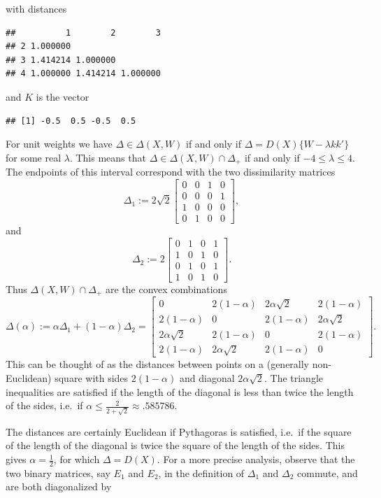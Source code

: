 \documentclass[
  12pt,
]{book}
\theoremstyle{definition}
\theoremstyle{definition}
\theoremstyle{definition}
\theoremstyle{definition}
\theoremstyle{remark}
\begin{document}
with distances

\begin{verbatim}
##          1        2        3
## 2 1.000000                  
## 3 1.414214 1.000000         
## 4 1.000000 1.414214 1.000000
\end{verbatim}

and \(K\) is the vector

\begin{verbatim}
## [1] -0.5  0.5 -0.5  0.5
\end{verbatim}

For unit weights we have \(\Delta\in\Delta(X,W)\) if and only if
\(\Delta=D(X)\{W-\lambda kk'\}\)
for some real \(\lambda\). This means that \(\Delta\in\Delta(X,W)\cap\Delta_+\) if and only if \(-4\leq\lambda\leq 4\). The endpoints of this interval correspond with the two dissimilarity matrices
\[
\Delta_1:=2\sqrt{2}\begin{bmatrix}0&0&1&0\\0&0&0&1\\1&0&0&0\\0&1&0&0\end{bmatrix},
\]
and
\[
\Delta_2:=2\begin{bmatrix}0&1&0&1\\1&0&1&0\\0&1&0&1\\1&0&1&0\end{bmatrix}.
\]
Thus \(\Delta(X,W)\cap\Delta_+\) are the convex combinations
\[
\Delta(\alpha):=\alpha\Delta_1+(1-\alpha)\Delta_2=
\begin{bmatrix}0&2(1-\alpha)&2\alpha\sqrt{2}&2(1-\alpha)\\2(1-\alpha)&0&2(1-\alpha)&2\alpha\sqrt{2}\\2\alpha\sqrt{2}&2(1-\alpha)&0&2(1-\alpha)\\2(1-\alpha)&2\alpha\sqrt{2}&2(1-\alpha)&0\end{bmatrix}.
\]
This can be thought of as the distances between points on a (generally non-Euclidean) square with sides \(2(1-\alpha)\) and diagonal \(2\alpha\sqrt{2}\). The triangle inequalities are satisfied if the length of the diagonal is less than twice the length of the sides, i.e.~if
\(\alpha\leq\frac{2}{2+\sqrt{2}}\approx .585786\).

The distances are certainly Euclidean if Pythagoras is satisfied, i.e.~if the square of the length of the diagonal is twice the square of the length of the sides. This gives \(\alpha=\frac12\), for which \(\Delta=D(X)\). For a more precise analysis, observe that the two binary matrices, say \(E_1\) and \(E_2\), in the definition of \(\Delta_1\) and \(\Delta_2\) commute, and are both diagonalized by
\end{document}
